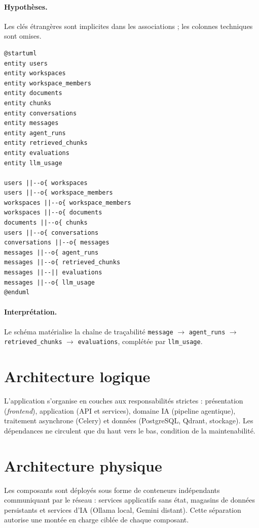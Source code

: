 \paragraph{Hypothèses.} Les clés étrangères sont implicites dans les associations ;
les colonnes techniques sont omises.

\begin{lstlisting}[style=plantuml,caption={Modèle de données (ERD)},label={lst:erd}]
@startuml
entity users
entity workspaces
entity workspace_members
entity documents
entity chunks
entity conversations
entity messages
entity agent_runs
entity retrieved_chunks
entity evaluations
entity llm_usage

users ||--o{ workspaces
users ||--o{ workspace_members
workspaces ||--o{ workspace_members
workspaces ||--o{ documents
documents ||--o{ chunks
users ||--o{ conversations
conversations ||--o{ messages
messages ||--o{ agent_runs
messages ||--o{ retrieved_chunks
messages ||--|| evaluations
messages ||--o{ llm_usage
@enduml
\end{lstlisting}

\paragraph{Interprétation.} Le schéma matérialise la chaîne de traçabilité
\texttt{message} $\rightarrow$ \texttt{agent\_runs} $\rightarrow$
\texttt{retrieved\_chunks} $\rightarrow$ \texttt{evaluations}, complétée par
\texttt{llm\_usage}.

\section{Architecture logique}
L'application s'organise en couches aux responsabilités strictes : présentation
(\emph{frontend}), application (API et services), domaine IA (pipeline agentique),
traitement asynchrone (Celery) et données (PostgreSQL, Qdrant, stockage). Les
dépendances ne circulent que du haut vers le bas, condition de la maintenabilité.

\section{Architecture physique}
Les composants sont déployés sous forme de conteneurs indépendants communiquant
par le réseau : services applicatifs sans état, magasins de données persistants et
services d'IA (Ollama local, Gemini distant). Cette séparation autorise une montée
en charge ciblée de chaque composant.

